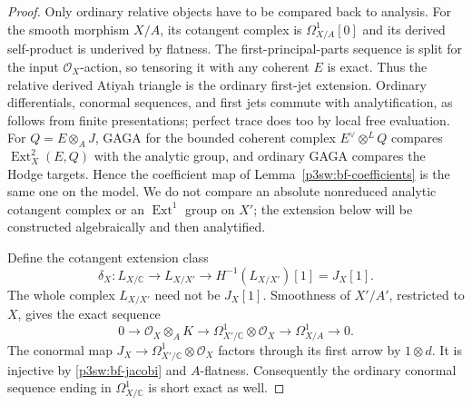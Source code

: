 \documentclass[11pt]{article}
\newcommand{\C}{\mathbb C}
\numberwithin{equation}{section}
\begin{document}
\begin{proof}
Only ordinary relative objects have to be compared back to
analysis.  For the smooth morphism \(X/A\), its cotangent
complex is \(\Omega^1_{X/A}[0]\) and its derived self-product
is underived by flatness.  The first-principal-parts sequence is
split for the input \(\mathcal O_X\)-action, so tensoring it with
any coherent \(E\) is exact.  Thus the relative derived Atiyah
triangle is the ordinary first-jet extension.  Ordinary
differentials, conormal sequences, and first jets commute with
analytification, as follows from finite presentations; perfect
trace does too by local free evaluation.  For
\(Q=E\otimes_AJ\), GAGA for the bounded coherent complex
\(E^\vee\otimes^LQ\) compares
\(\operatorname{Ext}^2_X(E,Q)\) with the analytic group, and
ordinary GAGA compares the Hodge targets.  Hence the coefficient
map of Lemma~\ref{p3sw:bf-coefficients} is the same one on the
model.  We do not compare an absolute nonreduced analytic
cotangent complex or an \(\operatorname{Ext}^1\) group on \(X'\);
the extension below will be constructed algebraically and then
analytified.

Define the cotangent extension class
\[
 \delta_X:L_{X/\C}\longrightarrow L_{X/X'}
       \longrightarrow H^{-1}(L_{X/X'})[1]=J_X[1].
\]
The whole complex \(L_{X/X'}\) need not be \(J_X[1]\).
Smoothness of \(X'/A'\), restricted to \(X\), gives the exact
sequence
\begin{equation}
\label{p3sw:bf-differentials}
 0\longrightarrow\mathcal O_X\otimes_AK
 \longrightarrow\Omega^1_{X'/\C}\otimes\mathcal O_X
 \longrightarrow\Omega^1_{X/A}\longrightarrow0.
\end{equation}
The conormal map \(J_X\to\Omega^1_{X'/\C}\otimes\mathcal O_X\)
factors through its first arrow by \(1\otimes d\).  It is
injective by \eqref{p3sw:bf-jacobi} and \(A\)-flatness.
Consequently the ordinary conormal sequence ending in
\(\Omega^1_{X/\C}\) is short exact as well.


\end{proof}
\end{document}

